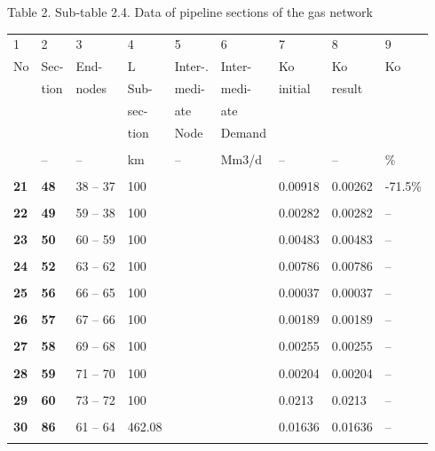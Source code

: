 \documentclass{article}
\begin{document}
\bigskip


\bigskip

\newpage

\bigskip

Table 2. Sub-table 2.4. Data of pipeline sections of the gas network

\bigskip

\begin{tabular}{lllllllll}
1 & 2 & 3 & 4 & 5 & 6 & 7 & 8 & 9 \\ 
No & Sec- & End- & L & Inter-. & Inter- & Ko & Ko & Ko \\ 
& tion & nodes & Sub- & medi- & medi- & initial & result &  \\ 
&  &  & sec- & ate & ate &  &  &  \\ 
&  &  & tion & Node & Demand &  &  &  \\ 
&  &  &  &  &  &  &  &  \\ 
& -- & -- & km & -- & Mm3/d & -- & -- & \% \\ 
&  &  &  &  &  &  &  &  \\ 
\textbf{21} & \textbf{48} & 38 -- 37 & 100 &  &  & 0.00918 & 0.00262 & 
-71.5\% \\ 
&  &  &  &  &  &  &  &  \\ 
\textbf{22} & \textbf{49} & 59 -- 38 & 100 &  &  & 0.00282 & 0.00282 & -- \\ 
&  &  &  &  &  &  &  &  \\ 
\textbf{23} & \textbf{50} & 60 -- 59 & 100 &  &  & 0.00483 & 0.00483 & -- \\ 
&  &  &  &  &  &  &  &  \\ 
\textbf{24} & \textbf{52} & 63 -- 62 & 100 &  &  & 0.00786 & 0.00786 & -- \\ 
&  &  &  &  &  &  &  &  \\ 
\textbf{25} & \textbf{56} & 66 -- 65 & 100 &  &  & 0.00037 & 0.00037 & -- \\ 
&  &  &  &  &  &  &  &  \\ 
\textbf{26} & \textbf{57} & 67 -- 66 & 100 &  &  & 0.00189 & 0.00189 & -- \\ 
&  &  &  &  &  &  &  &  \\ 
\textbf{27} & \textbf{58} & 69 -- 68 & 100 &  &  & 0.00255 & 0.00255 & -- \\ 
&  &  &  &  &  &  &  &  \\ 
\textbf{28} & \textbf{59} & 71 -- 70 & 100 &  &  & 0.00204 & 0.00204 & -- \\ 
&  &  &  &  &  &  &  &  \\ 
\textbf{29} & \textbf{60} & 73 -- 72 & 100 &  &  & 0.0213 & 0.0213 & -- \\ 
&  &  &  &  &  &  &  &  \\ 
\textbf{30} & \textbf{86} & 61 -- 64 & 462.08 &  &  & 0.01636 & 0.01636 & --
\\ 
&  &  &  &  &  &  &  & 
\end{tabular}
\end{document}
